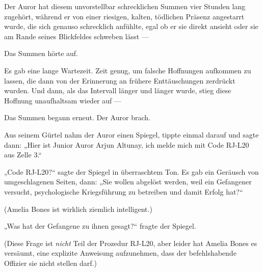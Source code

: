 Der Auror hat diesem unvorstellbar schrecklichen Summen vier Stunden lang zugehört, während er von einer riesigen, kalten, tödlichen Präsenz angestarrt wurde, die sich genauso schrecklich anfühlte, egal ob er sie direkt ansieht oder sie am Rande seines Blickfeldes schweben lässt —

Das Summen hörte auf.

 Es gab eine lange Wartezeit. Zeit genug, um falsche Hoffnungen aufkommen zu lassen, die dann von der Erinnerung an frühere Enttäuschungen zerdrückt wurden. Und dann, als das Intervall länger und länger wurde, stieg diese Hoffnung unaufhaltsam wieder auf —

Das Summen begann erneut. Der Auror brach.

Aus seinem Gürtel nahm der Auror einen Spiegel, tippte einmal darauf und sagte dann:
„Hier ist Junior Auror Arjun Altunay, ich melde mich mit Code RJ-L20 aus Zelle 3.“

„Code RJ-L20?“ sagte der Spiegel in überraschtem Ton. Es gab ein Geräusch von umgeschlagenen Seiten, dann:
„Sie wollen abgelöst werden, weil ein Gefangener versucht, psychologische Kriegsführung zu betreiben und damit Erfolg hat?“

(Amelia Bones ist wirklich ziemlich intelligent.)

„Was hat der Gefangene zu ihnen gesagt?“ fragte der Spiegel.

(Diese Frage ist \emph{nicht} Teil der Prozedur RJ-L20, aber leider hat Amelia Bones es versäumt, eine explizite Anweisung aufzunehmen, dass der befehlshabende Offizier sie nicht stellen darf.)

